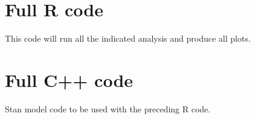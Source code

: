 
\section{Full R code}

	This code will run all the indicated analysis and produce all plots.

	

\section{Full C++ code}

	Stan model code to be used with the preceding R code.

	